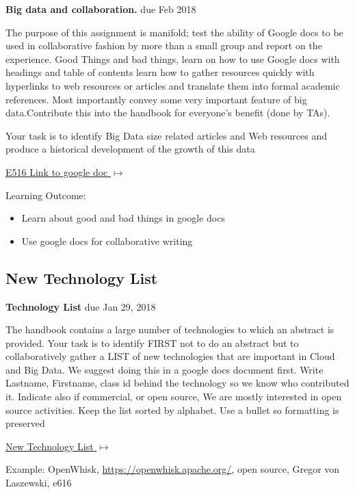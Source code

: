 \begin{exercise}\label{E:616-big-data-and-collaboration} {\bf Big
    data and collaboration.} due Feb 2018
    
  The purpose of this assignment is
  manifold; test the ability of Google docs to be used in
  collaborative fashion by more than a small group and report on the
  experience. Good Things and bad things, learn on how to use Google
  docs with headings and table of contents learn how to gather
  resources quickly with hyperlinks to web resources or articles and
  translate them into formal academic references. Most importantly
  convey some very important feature of big data.Contribute this into
  the handbook for everyone's benefit (done by TAs).  \smallskip

   Your task is to identify Big Data size related
  articles and Web resources and produce a historical development of
  the growth of this data

  {\hfill
    \href{https://docs.google.com/document/d/1ZHNdhX_Jx7uBQo0kthSYQ6TQR8_KNbgOwH2EuqBQcjY/edit?usp=sharing}{E516
      Link to google doc $\mapsto$}}


\end{exercise}

Learning Outcome:

\begin{itemize}
\item Learn about good and bad things in google docs
\item Use google docs for collaborative writing 
\end{itemize}


\subsection{New Technology List}
\label{E:616-new-tech}

\begin{exercise} {\bf Technology List} due Jan 29, 2018

 The handbook contains a large number of technologies to which an
 abstract is provided. Your task is to identify FIRST not to do an abstract but to
 collaboratively gather a LIST of new technologies that are important
 in Cloud and Big Data. We suggest doing this in a google docs document
 first. Write Lastname, Firstname, class id behind the technology so we
 know who contributed it. Indicate also if commercial, or open source,
 We are mostly interested in open source activities. Keep the list
 sorted by alphabet. Use a bullet so formatting is preserved

\smallskip

{\hfill \href{https://docs.google.com/document/d/1LeHGHTSBbaPXYVor0efhmi5W7JJjS7EQHABHqgRAPuU/edit?usp=sharing}{New Technology List $\mapsto$}}

\smallskip

Example: OpenWhisk, \url{https://openwhisk.apache.org/}, open source, Gregor von Laszewski, e616

\end{exercise}

